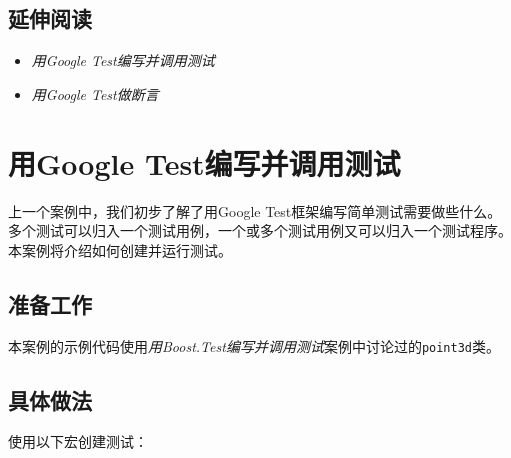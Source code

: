 
\subsection{延伸阅读}



\begin{itemize}
\item \textit{用Google Test编写并调用测试}



\item \textit{用Google Test做断言}

\end{itemize}



\section{用Google Test编写并调用测试}



上一个案例中，我们初步了解了用Google Test框架编写简单测试需要做些什么。多个测试可以归入一个测试用例，一个或多个测试用例又可以归入一个测试程序。本案例将介绍如何创建并运行测试。



\subsection{准备工作}



本案例的示例代码使用\textit{用Boost.Test编写并调用测试}案例中讨论过的\texttt{point3d}类。



\subsection{具体做法}



使用以下宏创建测试：



